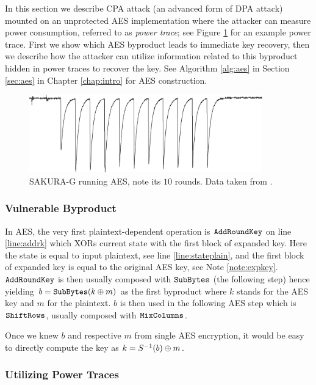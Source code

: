 In this section we describe CPA attack (an advanced form of DPA attack) mounted on an unprotected AES implementation where the attacker can measure power consumption, referred to as {\em power trace}; see Figure \ref{fig:powertrace} for an example power trace. First we show which AES byproduct leads to immediate key recovery, then we describe how the attacker can utilize information related to this byproduct hidden in power traces to recover the key. See Algorithm \ref{alg:aes} in Section \ref{sec:aes} in Chapter \ref{chap:intro} for AES construction.

\begin{figure}[h]
\begin{center}
	\includegraphics[width=0.9\textwidth]{./figures/power_trace/power_trace.png}
	\caption{SAKURA-G running AES, note its $10$ rounds. Data taken from \cite{exampletraces}.}
	\label{fig:powertrace}
\end{center}
\end{figure}

\subsubsection{Vulnerable Byproduct}

In AES, the very first plaintext-dependent operation is $\texttt{AddRoundKey}$ on line \ref{line:addrk} which XORs current state with the first block of expanded key. Here the state is equal to input plaintext, see line \ref{line:stateplain}, and the first block of expanded key is equal to the original AES key, see Note \ref{note:expkey}. $\texttt{AddRoundKey}$ is then usually composed with $\texttt{SubBytes}$ (the following step) hence yielding $b = \texttt{SubBytes}(k\oplus m)$ as the first byproduct where $k$ stands for the AES key and $m$ for the plaintext. $b$ is then used in the following AES step which is $\texttt{ShiftRows}$, usually composed with $\texttt{MixColumns}$.

Once we knew $b$ and respective $m$ from single AES encryption, it would be easy to directly compute the key as $k = S^{-1}(b)\oplus m$.

\subsubsection{Utilizing Power Traces}


